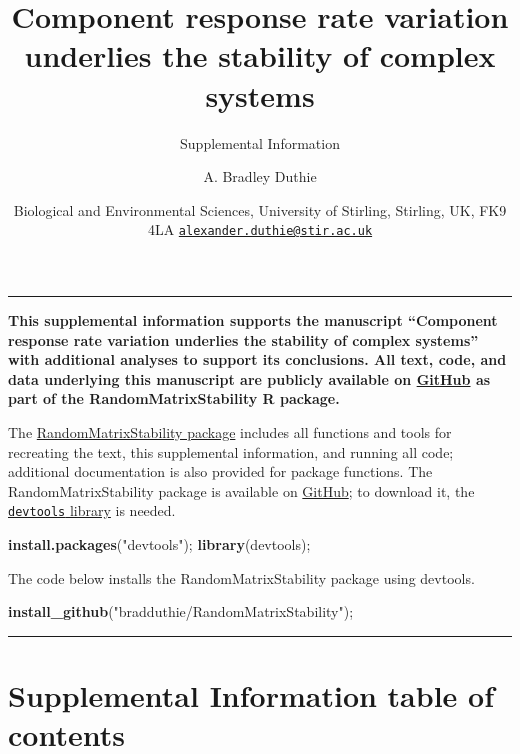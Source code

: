 \documentclass[]{article}
\title{Component response rate variation underlies the stability of complex
systems}
\subtitle{Supplemental Information}
\author{A. Bradley Duthie}
\date{Biological and Environmental Sciences, University of Stirling, Stirling,
UK, FK9 4LA
\href{mailto:alexander.duthie@stir.ac.uk}{\nolinkurl{alexander.duthie@stir.ac.uk}}}
\newenvironment{Shaded}{\begin{snugshade}}{\end{snugshade}}
\newcommand{\KeywordTok}[1]{\textcolor[rgb]{0.13,0.29,0.53}{\textbf{{#1}}}}
\newcommand{\StringTok}[1]{\textcolor[rgb]{0.31,0.60,0.02}{{#1}}}
\newcommand{\NormalTok}[1]{{#1}}
\begin{document}
\maketitle

\begin{center}\rule{0.5\linewidth}{\linethickness}\end{center}

\textbf{This supplemental information supports the manuscript
``Component response rate variation underlies the stability of complex
systems'' with additional analyses to support its conclusions. All text,
code, and data underlying this manuscript are publicly available on
\href{https://github.com/bradduthie/RandomMatrixStability}{GitHub} as
part of the RandomMatrixStability R package.}

The
\href{https://github.com/bradduthie/RandomMatrixStability}{RandomMatrixStability
package} includes all functions and tools for recreating the text, this
supplemental information, and running all code; additional documentation
is also provided for package functions. The RandomMatrixStability
package is available on
\href{https://github.com/bradduthie/RandomMatrixStability}{GitHub}; to
download it, the
\href{https://cran.r-project.org/web/packages/devtools/index.html}{\texttt{devtools}
library} is needed.

\begin{Shaded}
\begin{Highlighting}[]
\KeywordTok{install.packages}\NormalTok{(}\StringTok{"devtools"}\NormalTok{);}
\KeywordTok{library}\NormalTok{(devtools);}
\end{Highlighting}
\end{Shaded}

The code below installs the RandomMatrixStability package using
devtools.

\begin{Shaded}
\begin{Highlighting}[]
\KeywordTok{install_github}\NormalTok{(}\StringTok{"bradduthie/RandomMatrixStability"}\NormalTok{);}
\end{Highlighting}
\end{Shaded}

\begin{center}\rule{0.5\linewidth}{\linethickness}\end{center}

\section{Supplemental Information table of
contents}\label{supplemental-information-table-of-contents}
\end{document}
